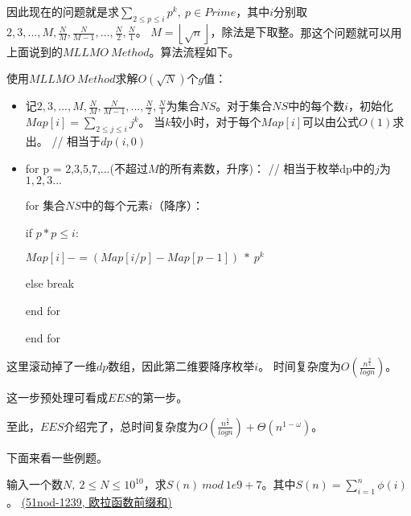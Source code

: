 \begin{solution}
\begin{itemize}
	{\heiti 因此现在的问题就是求$\sum_{2\le p\le i}p^{k},\ p\in Prime$，其中$i$分别取$2,3,...,M,\frac{N}{M},\frac{N}{M-1},...,\frac{N}{2},\frac{N}{1}$。
	$M=\left\lfloor \sqrt{n} \right\rfloor$，除法是下取整。}那这个问题就可以用上面说到的$MLLMO\ Method$。算法流程如下。
\end{itemize}
	
\vbox{}
	
{\heiti 使用$MLLMO\ Method$求解$O(\sqrt{N})$个$g$值：}

\begin{itemize}
	\item 记$2,3,...,M,\frac{N}{M},\frac{N}{M-1},...,\frac{N}{2},\frac{N}{1}$为集合$NS$。对于集合$NS$中的每个数$i$，初始化$Map[i] = \sum_{2\le j\le i}j^k$。
	当$k$较小时，对于每个$Map[i]$可以由公式$O(1)$求出。{\color{red} // 相当于$dp(i,0)$}
	\item for p = 2,3,5,7,...(不超过$M$的所有素数，升序)：{\color{red} // 相当于枚举dp中的$j$为$1,2,3...$}
	
	\quad \quad for 集合$NS$中的每个元素$i$（降序）：
	
	\quad \quad \quad \quad if $p*p\le i$:
	
	\quad \quad \quad \quad \quad \quad $Map[i]-=(Map[i/p] - Map[p-1])\ *\ p^k$
	
	\quad \quad \quad \quad else break
	
	\quad \quad end for
	
	end for
\end{itemize}

\begin{note}
	这里滚动掉了一维$dp$数组，因此第二维要降序枚举$i$。
	时间复杂度为$O(\frac {n^{\frac 3 4}}{ log n})$。
	
	这一步预处理可看成$EES$的第一步。
\end{note}
	
\vbox{}
	
\end{solution}

至此，$EES$介绍完了，总时间复杂度为$O(\frac {n^{\frac 3 4}}{ log n})+\Theta(n^{1-\omega})$。

下面来看一些例题。

\vbox{}

\begin{example}
	输入一个数$N,\ 2\le N\le 10^{10}$，求$S(n)\ mod\ 1e9+7$。其中$S(n)=\sum_{i=1}^{n}\phi(i)$。
	\href{https://www.51nod.com/Challenge/Problem.html#problemId=1239}{(51nod-1239, 欧拉函数前缀和)}
\end{example}

